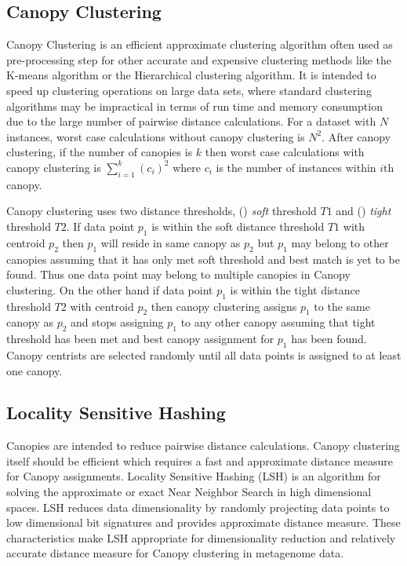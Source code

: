 \documentclass[10pt, conference, compsocconf]{IEEEtran}
\begin{document}
\subsection{\textbf{Canopy Clustering}}

Canopy Clustering \cite{MARCanopy} is an efficient approximate clustering algorithm often used as pre-processing step for other accurate and expensive clustering methods like the K-means algorithm or the Hierarchical clustering algorithm. It is intended to speed up clustering operations on large data sets, where standard clustering algorithms may be impractical in terms of run time and memory consumption due to the large number of pairwise distance calculations. For a dataset with $N$ instances, worst case calculations without canopy clustering is $N^2$. After canopy clustering, if the number of canopies is $k$ then worst case calculations with canopy clustering is $\sum_{i=1}^{k}(c_i)^2$ where $c_i$ is the number of instances within $i$th canopy.

Canopy clustering uses two distance thresholds, () \textit{soft} threshold $T1$ and () \textit{tight} threshold $T2$. If data point $p_1$ is within the soft distance threshold $T1$ with centroid $p_2$ then $p_1$ will reside in same canopy as $p_2$ but $p_1$ may belong to other canopies assuming that it has only met soft threshold and best match is yet to be found. Thus one data point may belong to multiple canopies in Canopy clustering. On the other hand if data point $p_1$ is within the tight distance threshold $T2$ with centroid $p_2$ then canopy clustering assigns $p_1$ to the same canopy as $p_2$ and stops assigning $p_1$ to any other canopy assuming that tight threshold has been met and best canopy assignment for $p_1$ has been found. Canopy centrists are selected randomly until all data points is assigned to at least one canopy. 


\subsection{\textbf{Locality Sensitive Hashing}}

Canopies are intended to reduce pairwise distance calculations. Canopy clustering itself should be efficient which requires a fast and approximate distance measure for Canopy assignments. Locality Sensitive Hashing (LSH) \cite{MARLshRef2} is an algorithm for solving the approximate or exact Near Neighbor Search in high dimensional spaces. LSH reduces data dimensionality by randomly projecting data points to low dimensional bit signatures and provides approximate distance measure. These characteristics make LSH appropriate for dimensionality reduction and relatively accurate distance measure for Canopy clustering in metagenome data.
\end{document}
